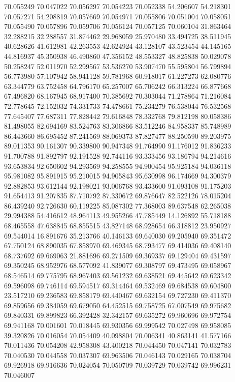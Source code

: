 70.055249
70.047022
70.056297
70.054223
70.052338
54.206607
54.218301
70.057271
54.208819
70.057669
70.054971
70.055806
70.051004
70.058051
70.055490
70.057896
70.059706
70.056124
70.057125
70.060104
31.863464
32.288215
32.288557
31.874462
29.968059
25.970480
33.494725
38.511945
40.628626
41.612981
42.263553
42.624924
43.128107
43.523454
44.145165
44.816937
45.350938
46.490860
47.356152
48.553327
48.825838
50.029078
50.258247
52.011970
52.299567
53.536270
53.907470
55.595804
56.799894
56.773980
57.107942
58.941128
59.781968
60.918017
61.227273
62.080776
63.344779
63.752458
64.796170
65.257007
65.706242
66.313224
66.877668
67.496820
68.167945
68.917400
70.385692
70.303044
71.278864
71.216084
72.778645
72.152032
74.331733
74.478661
75.234279
76.538044
76.532568
77.645407
77.687311
77.828442
79.616848
78.332768
79.812198
80.058386
81.498055
82.694169
83.524763
83.306866
83.512246
84.958337
85.748989
86.443660
86.695452
87.241569
88.069373
87.827477
88.250590
89.203975
89.011353
90.161307
90.339800
90.947348
91.764990
91.176012
91.836233
91.700788
91.892797
92.191528
92.744116
93.333456
93.186794
94.214616
93.653834
92.650602
94.293569
94.258555
94.900454
95.925184
94.036118
95.981082
95.891915
95.210015
94.905843
95.630998
96.174669
94.300379
92.882853
93.612144
92.198021
93.006768
93.433600
91.093108
91.175203
91.654413
91.207835
87.710792
87.330672
69.876647
82.522126
78.015204
86.439240
92.726630
60.119225
85.087302
77.368003
89.637548
62.265038
29.994388
54.416612
48.964113
49.955266
47.785449
14.126892
55.718188
68.465558
47.638845
68.855515
43.827148
68.928654
66.318812
23.950927
69.544014
16.891676
35.213766
40.146133
69.640030
69.205940
69.351472
67.750124
68.890035
67.858970
69.469345
68.793477
69.414036
69.408140
68.737692
69.669063
21.881696
69.271509
69.369337
69.129404
69.431597
69.350245
68.952976
68.577092
41.839077
69.308797
69.473495
69.058967
68.546514
69.775795
68.967403
69.561232
69.638521
69.445642
69.623342
69.596098
69.746114
69.594517
69.314464
69.532469
69.684538
69.604800
23.517210
69.236583
69.858179
69.440467
69.632154
69.727230
69.411370
69.859656
69.384059
69.679050
64.452515
69.758725
67.007549
69.975682
69.840331
69.899823
66.392428
32.342157
69.635272
69.960696
69.972754
69.941168
70.001601
70.018445
69.930356
69.999542
70.027498
69.958085
39.320826
70.016054
70.054409
40.098804
70.006341
40.863141
41.577166
70.011436
70.054208
42.958308
43.400218
70.044450
70.047141
70.032783
70.040530
70.044558
70.037307
69.963506
70.046143
70.029165
70.038704
69.926918
69.916636
70.024054
70.050709
70.039729
70.039742
69.996231
70.046007
